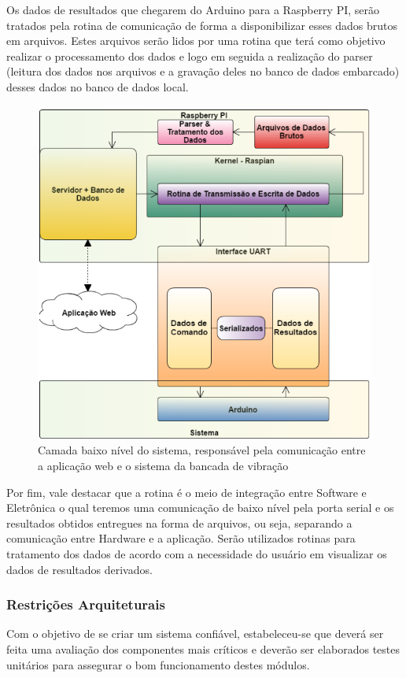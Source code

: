 Os dados de resultados que chegarem do Arduino para a Raspberry PI, serão tratados pela rotina de comunicação de forma a disponibilizar esses dados brutos em arquivos. Estes arquivos serão lidos por uma rotina que terá como objetivo realizar o processamento dos dados e logo em seguida a realização do parser (leitura dos dados nos arquivos e a gravação deles no banco de dados embarcado) desses dados no banco de dados local.

\begin{figure}[!ht]
\centering
\includegraphics[scale=0.5]{figuras/sistema.png}
\caption{Camada baixo nível do sistema, responsável pela comunicação entre a aplicação web e o sistema da bancada de vibração}
\label{fig:sistema}
\end{figure}

Por fim, vale destacar que a rotina é o meio de integração entre Software e Eletrônica o qual teremos uma comunicação de baixo nível pela porta serial e os resultados obtidos entregues na forma de arquivos, ou seja, separando a comunicação entre Hardware e a aplicação. Serão utilizados rotinas para tratamento dos dados de acordo com a necessidade do usuário em visualizar os dados de resultados derivados.

\subsubsection*{\textbf{Restrições Arquiteturais}}
Com o objetivo de se criar um sistema confiável, estabeleceu-se que deverá ser feita uma avaliação dos componentes mais críticos e deverão ser elaborados testes unitários para assegurar o bom funcionamento destes módulos.

